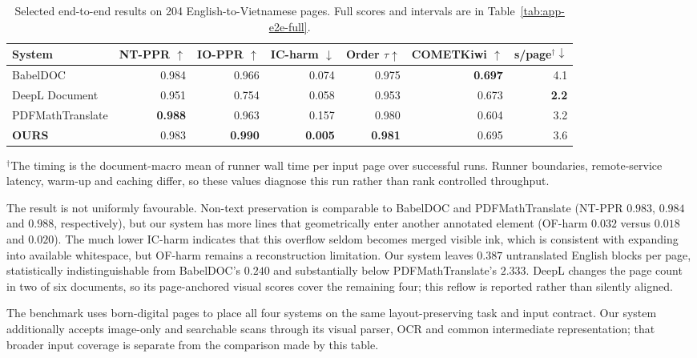 \begin{table}[H]
\centering
\caption{Selected end-to-end results on 204 English-to-Vietnamese pages. Full
scores and intervals are in Table~\ref{tab:app-e2e-full}.}
\label{tab:res-e2e-compact}
\scriptsize
\setlength{\tabcolsep}{3pt}
\begin{tabular}{@{}lrrrrrr@{}}
\toprule
System & NT-PPR $\uparrow$ & IO-PPR $\uparrow$ & IC-harm $\downarrow$ & Order $\tau\uparrow$ & COMETKiwi $\uparrow$ & s/page$^{\dagger}\downarrow$ \\
\midrule
BabelDOC         & 0.984 & 0.966 & 0.074 & 0.975 & \textbf{0.697} & 4.1 \\
DeepL Document   & 0.951 & 0.754 & 0.058 & 0.953 & 0.673 & \textbf{2.2} \\
PDFMathTranslate & \textbf{0.988} & 0.963 & 0.157 & 0.980 & 0.604 & 3.2 \\
\textbf{OURS}    & 0.983 & \textbf{0.990} & \textbf{0.005} & \textbf{0.981} & 0.695 & 3.6 \\
\bottomrule
\end{tabular}
\end{table}

\noindent${}^{\dagger}$The timing is the document-macro mean of runner wall time
per input page over successful runs. Runner boundaries, remote-service latency,
warm-up and caching differ, so these values diagnose this run rather than rank
controlled throughput.

The result is not uniformly favourable. Non-text preservation is comparable to
BabelDOC and PDFMathTranslate (NT-PPR $0.983$, $0.984$ and $0.988$,
respectively), but our system has more lines that geometrically enter another
annotated element (OF-harm $0.032$ versus $0.018$ and $0.020$). The much lower
IC-harm indicates that this overflow seldom becomes merged visible ink, which
is consistent with expanding into available whitespace, but OF-harm remains a
reconstruction limitation. Our system leaves $0.387$ untranslated English
blocks per page, statistically indistinguishable from BabelDOC's $0.240$ and
substantially below PDFMathTranslate's $2.333$. DeepL changes the page count in
two of six documents, so its page-anchored visual scores cover the remaining
four; this reflow is reported rather than silently aligned.

The benchmark uses born-digital pages to place all four systems on the same
layout-preserving task and input contract. Our system additionally accepts
image-only and searchable scans through its visual parser, OCR and common
intermediate representation; that broader input coverage is separate from the
comparison made by this table.

